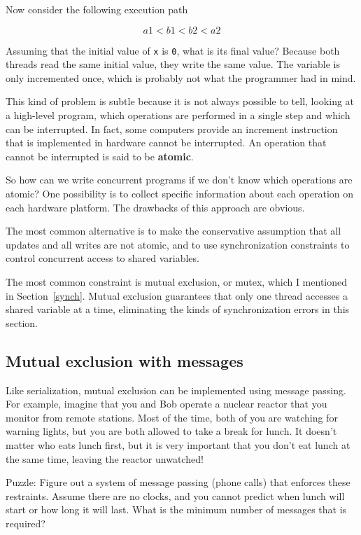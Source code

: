 \documentclass{book}
\begin{document}
Now consider the following execution path 

\[  a1 < b1 < b2 < a2  \]

Assuming that the
initial value of {\tt x} is {\tt 0},
what is its final value?  Because
both threads read the same initial value, they write
the same value.  The variable is only incremented once, which
is probably not what the programmer had in mind.

This kind of problem is subtle because it is not always possible to
tell, looking at a high-level program, which operations are
performed in a single step and which can be interrupted.
In fact, some computers provide an increment instruction that
is implemented in hardware cannot be interrupted.
An operation that cannot be interrupted is said to be
{\bf atomic}.

So how can we write concurrent programs if we don't know which
operations are atomic?  One possibility is to collect specific
information about each operation on each hardware platform.
The drawbacks of this approach are obvious.

The most common alternative is to make the conservative
assumption that all updates and all writes are not atomic,
and to use synchronization constraints to control concurrent
access to shared variables.

The most common constraint is mutual exclusion, or mutex,
which I mentioned in Section~\ref{synch}.  Mutual exclusion guarantees
that only one thread accesses a shared variable at a time,
eliminating the kinds of synchronization errors in this section.


\subsection {Mutual exclusion with messages}

Like serialization, mutual exclusion
can be implemented using message passing.  For example, imagine that
you and Bob operate a nuclear reactor that you monitor from remote
stations.  Most of the time, both of you are watching for warning
lights, but you are both allowed to take a break for lunch.  It
doesn't matter who eats lunch first, but it is very important that
you don't eat lunch at the same time, leaving the reactor unwatched!

Puzzle: Figure out a system of message passing (phone calls) that
enforces these restraints.  Assume there are no clocks, and you
cannot predict when lunch will start or how long it will last.  What
is the minimum number of messages that is required?
\end{document}
